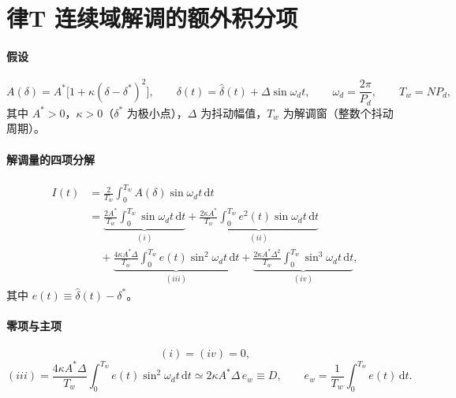 \documentclass[11pt,a4paper]{article}
\begin{document}
\section{律T 连续域解调的额外积分项}

\paragraph{假设}
\begin{equation}
A(\delta)=A^{*}\bigl[1+\kappa(\delta-\delta^{*})^{2}\bigr],
\qquad
\delta(t)=\hat\delta(t)+\Delta\sin\omega_d t,
\qquad
\omega_d=\frac{2\pi}{P_d},
\qquad
T_w=NP_d ,
\label{eq:esA}
\end{equation}
其中 $A^{*}>0$，$\kappa>0$（$\delta^{*}$ 为极小点），$\Delta$ 为抖动幅值，$T_w$ 为解调窗（整数个抖动周期）。

\paragraph{解调量的四项分解}
\begin{equation}
\begin{aligned}
I(t)
&=\frac{2}{T_w}\int_{0}^{T_w}A(\delta)\sin\omega_d t\,\mathrm{d}t\\[2pt]
&=\underbrace{\frac{2A^{*}}{T_w}\int_{0}^{T_w}\sin\omega_d t\,\mathrm{d}t}_{(i)}
+\underbrace{\frac{2\kappa A^{*}}{T_w}\int_{0}^{T_w}e^{2}(t)\sin\omega_d t\,\mathrm{d}t}_{(ii)}\\
&\quad
+\underbrace{\frac{4\kappa A^{*}\Delta}{T_w}\int_{0}^{T_w}e(t)\sin^{2}\omega_d t\,\mathrm{d}t}_{(iii)}
+\underbrace{\frac{2\kappa A^{*}\Delta^{2}}{T_w}\int_{0}^{T_w}\sin^{3}\omega_d t\,\mathrm{d}t}_{(iv)},
\end{aligned}
\label{eq:esI}
\end{equation}
其中 $e(t)\equiv\hat\delta(t)-\delta^{*}$。

\paragraph{零项与主项}
\begin{equation}
(i)=(iv)=0,
\label{eq:eszero}
\end{equation}
\begin{equation}
(iii)=\frac{4\kappa A^{*}\Delta}{T_w}\int_{0}^{T_w}e(t)\sin^{2}\omega_d t\,\mathrm{d}t
\simeq 2\kappa A^{*}\Delta\,e_w\equiv D,
\qquad e_w=\frac{1}{T_w}\int_{0}^{T_w}e(t)\,\mathrm{d}t .
\label{eq:esD}
\end{equation}
\end{document}
